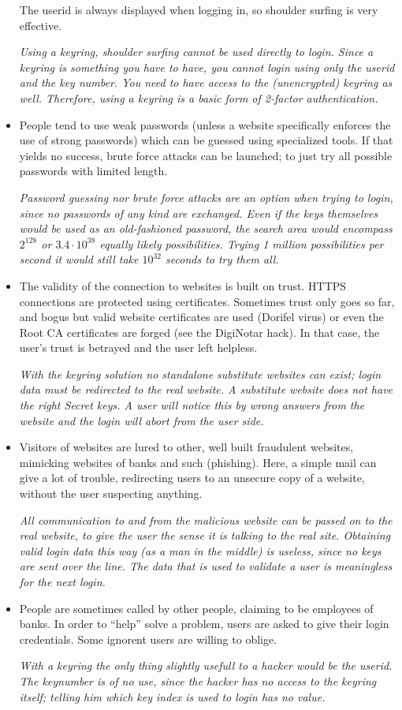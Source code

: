 \begin{itemize}
The userid is always displayed when logging in, so shoulder surfing is very effective.
\par
\emph{Using a keyring, shoulder surfing cannot be used directly to login.
Since a keyring is something you have to have, you cannot login using only the userid and the key number.
You need to have access to the (unencrypted) keyring as well.
Therefore, using a keyring is a basic form of 2-factor authentication.}
\item People tend to use weak passwords (unless a website specifically enforces the use of strong passwords) which can be guessed using specialized tools.
If that yields no success, brute force attacks can be launched; to just try all possible passwords with limited length.
\par
\emph{Password guessing nor brute force attacks are an option when trying to login, since no passwords of any kind are exchanged.
Even if the keys themselves would be used as an old-fashioned password, the search area would encompass $2^{128}$ or $3.4\cdot 10^{38}$ equally likely possibilities.
Trying 1 million possibilities per second it would still take $10^{32}$ seconds to try them all.}
\item The validity of the connection to websites is built on trust.
HTTPS connections are protected using certificates.
Sometimes trust only goes so far, and bogus but valid website certificates are used (Dorifel virus) or even the Root CA certificates are forged (see the DigiNotar hack).
In that case, the user's trust is betrayed and the user left helpless.
\par
\emph{With the keyring solution no standalone substitute websites can exist; login data must be redirected to the real website.
A substitute website does not have the right Secret keys.
A user will notice this by wrong answers from the website and the login will abort from the user side.}
\item Visitors of websites are lured to other, well built fraudulent websites, mimicking websites of banks and such (phishing).
Here, a simple mail can give a lot of trouble, redirecting users to an unsecure copy of a website, without the user suspecting anything.
\par
\emph{All communication to and from the malicious website can be passed on to the real website, to give the user the sense it is talking to the real site.
Obtaining valid login data this way (as a man in the middle) is useless, since no keys are sent over the line.
The data that is used to validate a user is meaningless for the next login.}
\item People are sometimes called by other people, claiming to be employees of banks.
In order to ``help'' solve a problem, users are asked to give their login credentials.
Some ignorent users are willing to oblige.
\par
\emph{With a keyring the only thing slightly usefull to a hacker would be the userid.
The keynumber is of no use,
since the hacker has no access to the keyring itself;
telling him which key index is used to login has no value.}
\end{itemize}

